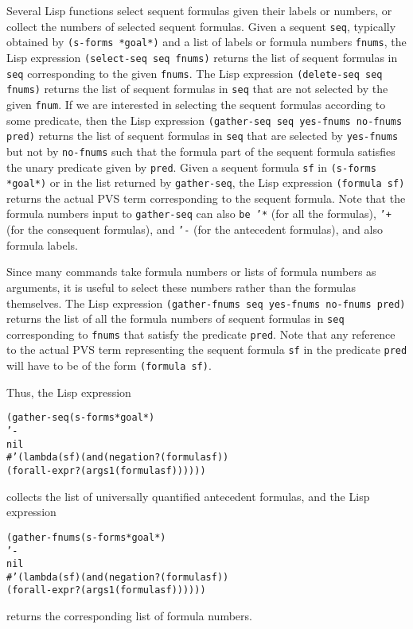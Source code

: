 \documentclass[12pt]{book}
\begin{document}
 Several Lisp functions  select sequent formulas
given their labels or numbers, or collect the numbers 
of selected sequent formulas.  Given a sequent \texttt{seq}, typically obtained
by \texttt{(s-forms *goal*)} and a list of labels or formula
numbers \texttt{fnums},  the Lisp expression \texttt{(select-seq seq fnums)}
returns the list of sequent formulas in \texttt{seq} corresponding to the
given \texttt{fnums}\@.  The Lisp expression \texttt{(delete-seq seq fnums)}
returns the list of sequent formulas in \texttt{seq} that are not
selected by the given \texttt{fnum}\@.  If we are interested in
selecting the sequent formulas according to some predicate, then
the Lisp expression \texttt{(gather-seq seq yes-fnums no-fnums pred)}
returns the list of sequent formulas in \texttt{seq} that are selected
by \texttt{yes-fnums} but not by \texttt{no-fnums} such that the formula part
of the sequent formula satisfies the unary predicate given by \texttt{pred}\@.  Given a sequent formula \texttt{sf} in \texttt{(s-forms *goal*)} or in the list returned by \texttt{gather-seq}, the Lisp expression
\texttt{(formula sf)} returns the actual PVS term corresponding to the
sequent formula.  Note that the formula numbers input to \texttt{gather-seq}
can also \texttt{be '*} (for all the formulas), \texttt{'+} (for the
consequent formulas), and \texttt{'-} (for the antecedent formulas),
and also formula labels. 

Since many commands take  formula numbers or lists of formula numbers as
arguments, it is useful to select these numbers rather than the formulas
themselves.  The Lisp expression \texttt{(gather-fnums seq yes-fnums no-fnums
pred)} returns the list of all the formula numbers of sequent formulas in
\texttt{seq} corresponding to \texttt{fnums} that satisfy the predicate \texttt{pred}\@.  Note that any reference to the actual PVS term representing
the sequent formula \texttt{sf} in the predicate \texttt{pred} will have to be
of the form \texttt{(formula sf)}\@.  


Thus, the Lisp expression
\begin{alltt}
  (gather-seq (s-forms *goal*)
              '-
              nil
              \#'(lambda (sf) (and (negation? (formula sf))
                               (forall-expr? (args1 (formula sf))))))
\end{alltt}
collects the list of universally quantified
antecedent formulas, and the Lisp expression
\begin{alltt}
  (gather-fnums (s-forms *goal*)
                '-
                nil
              \#'(lambda (sf) (and (negation? (formula sf))
                               (forall-expr? (args1 (formula sf))))))
\end{alltt}
returns the corresponding list of formula numbers.
\end{document}
